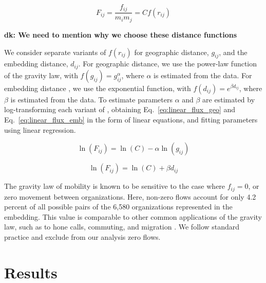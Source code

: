 \documentclass[12pt]{article} %
\def\dk#1{ {\color{red}\textbf{dk: #1}} }
\begin{document}
\begin{equation}
	\label{eq:gravity_flux}
	F_{ij} = \frac{f_{ij}}{m_{i}m_{j}} = Cf(r_{ij})
\end{equation}

\dk{We need to mention why we choose these distance functions}

We consider separate variants of $f(r_{ij})$ for geographic distance, $g_{ij}$, and the embedding distance, $d_{ij}$. 
For geographic distance, we use the power-law function of the gravity law, with $f(g_{ij})= g^{\alpha}_{ij}$, where $\alpha$ is estimated from the data. 
For embedding distance , we use the exponential function, with $f(d_{ij}) = e^{\beta d_{ij}}$, where $\beta$ is estimated from the data. 
To estimate parameters $\alpha$ and $\beta$ are estimated by log-transforming each variant of \label{eq:gravity_flux}, obtaining Eq.~\ref{eq:linear_flux_geo} and Eq.~\ref{eq:linear_flux_emb} in the form of linear equations, and fitting parameters using linear regression. 

\begin{equation}
	\label{eq:linear_flux_geo}
	\ln(F_{ij}) = \ln(C) - \alpha \ln(g_{ij})
\end{equation}

\begin{equation}
	\label{eq:linear_flux_emb}
	\ln(F_{ij}) = \ln(C) + \beta d_{ij}
\end{equation}

The gravity law of mobility is known to be sensitive to the case where $f_{ij} = 0$, or zero movement between organizations. 
Here, non-zero flows account for only 4.2 percent of all possible pairs of  the 6,580 organizations represented in the embedding.
This value is comparable to other common applications of the gravity law, such as to hone calls, commuting, and migration \cite{simini2012universal}.
We follow standard practice and exclude from our analysis zero flows. 

\section{Results}\label{sec:results} %
\end{document}
